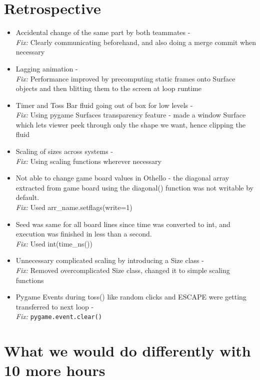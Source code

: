 \documentclass[12pt]{article}
\begin{document}
\section{Retrospective}
\begin{itemize}
    \item Accidental change of the same part by both teammates - \\
    \emph{Fix:} Clearly communicating beforehand, and also doing a merge commit when necessary
    \item Lagging animation - \\
    \emph{Fix:} Performance improved by precomputing static frames onto Surface objects and then blitting them to the screen at loop runtime \cite{pygame_surface}
    \item Timer and Toss Bar fluid going out of box for low levels - \\
    \emph{Fix:} Using pygame Surfaces transparency feature - made a window Surface \\ which lets viewer peek through only the shape we want, hence clipping the fluid \cite{pygame_transparency}
    \item Scaling of sizes across systems - \\
    \emph{Fix:} Using scaling functions wherever necessary
    \item Not able to change game board values in Othello - the diagonal array extracted from game board using the diagonal() function was not writable by default.\\
    \emph{Fix:} Used arr\_name.setflags(write=1) \cite{numpy_setflags}
    \item Seed was same for all board lines since time was converted to int, and execution was finished in less than a second. \\
    \emph{Fix:} Used int(time\_ns())
    \item Unnecessary complicated scaling by introducing a Size class - \\
    \emph{Fix:} Removed overcomplicated Size class, changed it to simple scaling functions 
	\item Pygame Events during toss() like random clicks and ESCAPE were getting transferred to next loop - \\
    \emph{Fix:} \texttt{pygame.event.clear()}
\end{itemize}

\section{What we would do differently with 10 more hours}
\end{document}
